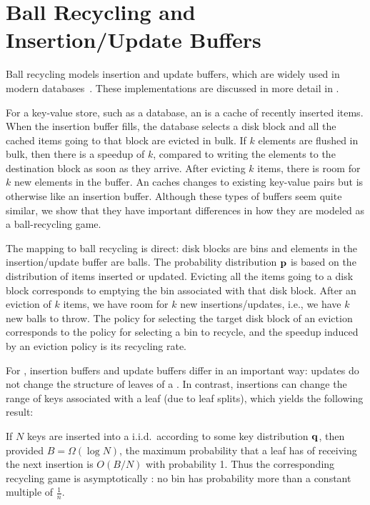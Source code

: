 
\section{Ball Recycling and Insertion/Update Buffers}\label{sec:motivation}

Ball recycling models insertion and update buffers, which are widely used in
modern databases~\cite{Azure16, IBM17, Xiang12, Informix, Callaghan11, NuDB16,
Oracle17, SAP17, Vertica17,CanimLaMi10,BenderFaJo12}. These implementations are
discussed in more detail in .

For a key-value store, such as a database, an  is a
cache of recently inserted items.  When the insertion buffer fills, the
database selects a disk block and all the cached items going to that block are
evicted in bulk.  If $k$ elements are flushed in bulk, then there is a speedup
of $k$, compared to writing the elements to the destination block as soon as
they arrive. After evicting $k$ items, there is room for $k$ new elements in
the buffer.  An  caches changes to existing key-value pairs
but is otherwise like an insertion buffer.  Although these types of buffers
seem quite similar, we show that they have important differences in how they
are modeled as a ball-recycling game.

The mapping to ball recycling is direct: disk blocks are bins and elements in
the insertion/update buffer are balls.  The probability distribution $\mathbf{p}$ is
based on the distribution of items inserted  or updated.  Evicting all the
items going to a disk block corresponds to emptying the bin associated with
that disk block.  After an eviction of $k$ items, we have room for $k$ new
insertions/updates, i.e., we have $k$ new balls to throw.  The policy for
selecting the target disk block of an eviction corresponds to the policy for
selecting a bin to recycle, and the speedup induced by an eviction policy is
its recycling rate.  

For \btrees{}, insertion buffers and update buffers differ in an important way:
updates do not change the structure of leaves of a \btree{}. In contrast,
insertions can change the range of keys associated with a leaf (due to leaf
splits), which yields the following result:

\begin{lemma}\label{lem:uniform-leaves}
	If $N$ keys are inserted into a \btree{} i.i.d.\ according to some key
	distribution $\mathbf{q}$, then provided $B = \Omega(\log{N})$, the maximum
	probability that a leaf has of receiving the next insertion is $O(B/N)$
	with probability 1.  Thus the corresponding recycling game is
	asymptotically : no bin has probability more than a
	constant multiple of $\frac{1}{n}$.
\end{lemma}


